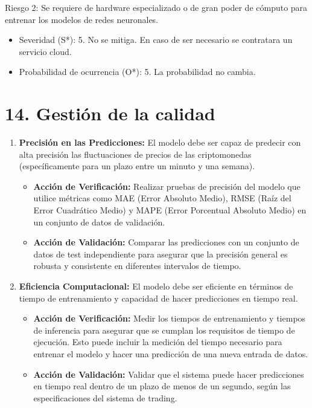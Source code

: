 \documentclass[
    11pt, %
]{charter}
\begin{document}
        Riesgo 2: Se requiere de hardware especializado o de gran poder de cómputo para entrenar los modelos de redes neuronales.
        \begin{itemize}
        \item Severidad (S*): 5.
          No se mitiga. En caso de ser necesario se contratara un servicio cloud.
        \item Probabilidad de ocurrencia (O*): 5.
          La probabilidad no cambia.
        \end{itemize}

    \newpage
    \section{14. Gestión de la calidad}
    \label{sec:calidad}
    \begin{enumerate}
    \item \textbf{Precisión en las Predicciones:} El modelo debe ser capaz de predecir con alta precisión las fluctuaciones de precios de las criptomonedas (específicamente para un plazo entre un minuto y una semana).
      \begin{itemize}
      \item \textbf{Acción de Verificación:} Realizar pruebas de precisión del modelo que utilice métricas como MAE (Error Absoluto Medio), RMSE (Raíz del Error Cuadrático Medio) y MAPE (Error Porcentual Absoluto Medio) en un conjunto de datos de validación.
      \item \textbf{Acción de Validación:} Comparar las predicciones con un conjunto de datos de test independiente para asegurar que la precisión general es robusta y consistente en diferentes intervalos de tiempo.
      \end{itemize}

    \item \textbf{Eficiencia Computacional:} El modelo debe ser eficiente en términos de tiempo de entrenamiento y capacidad de hacer predicciones en tiempo real.
      \begin{itemize}
      \item \textbf{Acción de Verificación:} Medir los tiempos de entrenamiento y tiempos de inferencia para asegurar que se cumplan los requisitos de tiempo de ejecución. Esto puede incluir la medición del tiempo necesario para entrenar el modelo y hacer una predicción de una nueva entrada de datos.
      \item \textbf{Acción de Validación:} Validar que el sistema puede hacer predicciones en tiempo real dentro de un plazo de menos de un segundo, según las especificaciones del sistema de trading.
      \end{itemize}


\end{enumerate}
\end{document}
